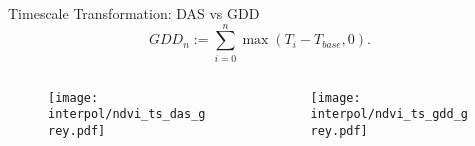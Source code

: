 \begin{frame}{Timescale Transformation: DAS vs GDD}
	\begin{equation*}
		GDD_n := \sum_{i=0}^n \max(T_i - T_{base}, 0).
	\end{equation*}

	\begin{columns}
		
		\begin{column}{0.48\textwidth}
			\begin{figure}
				\texttt{[image: interpol/ndvi\_ts\_das\_grey.pdf]}
			\end{figure}
		\end{column}
		\begin{column}{0.48\textwidth}
			\begin{figure}
				\texttt{[image: interpol/ndvi\_ts\_gdd\_grey.pdf]}
			\end{figure}
		\end{column}
		
	\end{columns}
\end{frame}


